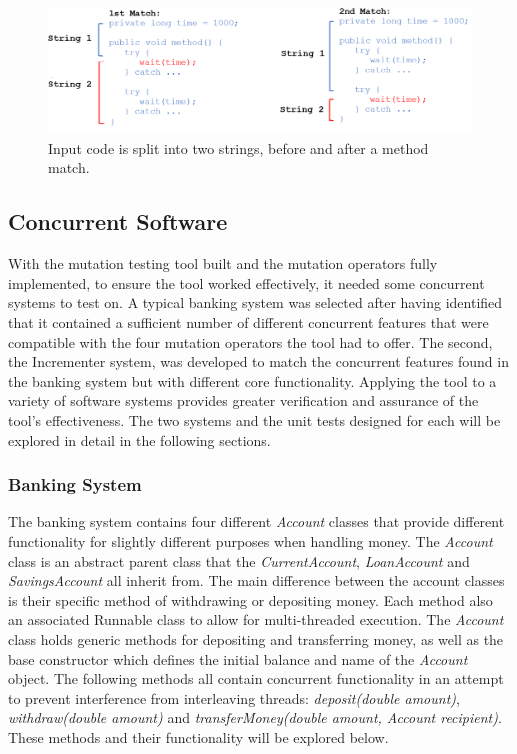 \documentclass[a4paper,12pt]{article}
\begin{document}
\begin{figure}[h]
    \hspace{-1.6cm}
    \includegraphics[scale =0.4]{random_match.png}
    \caption{Input code is split into two strings, before and after a method match.}
    \label{fig:rand_match}
\end{figure}


\subsection{Concurrent Software}

With the mutation testing tool built and the mutation operators fully implemented, to ensure the tool worked effectively, it needed some concurrent systems to test on. A typical banking system was selected after having identified that it contained a sufficient number of different concurrent features that were compatible with the four mutation operators the tool had to offer. The second, the Incrementer system, was developed to match the concurrent features found in the banking system but with different core functionality. Applying the tool to a variety of software systems provides greater verification and assurance of the tool's effectiveness. The two systems and the unit tests designed for each will be explored in detail in the following sections.


\subsubsection{Banking System}

The banking system contains four different \textit{Account} classes that provide different functionality for slightly different purposes when handling money. The \textit{Account} class is an abstract parent class that the \textit{CurrentAccount}, \textit{LoanAccount} and \textit{SavingsAccount} all inherit from. The main difference between the account classes is their specific method of withdrawing or depositing money. Each method also an associated Runnable class to allow for multi-threaded execution. The \textit{Account} class holds generic methods for depositing and transferring money, as well as the base constructor which defines the initial balance and name of the \textit{Account} object. The following methods all contain concurrent functionality in an attempt to prevent interference from interleaving threads:  \textit{deposit(double amount)}, \textit{withdraw(double amount)} and \textit{transferMoney(double amount, Account recipient)}. These methods and their functionality will be explored below. 
\end{document}
